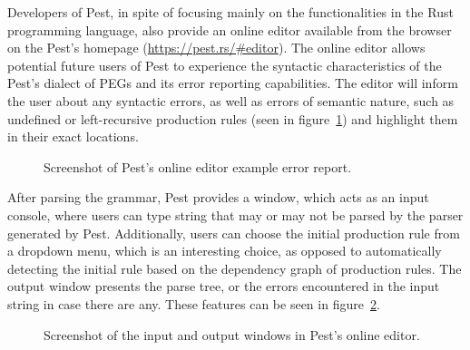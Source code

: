 \documentclass[english,engineering]{wizthesis}
\begin{document}
Developers of Pest, in spite of focusing mainly on the functionalities in the
Rust programming language, also provide an online editor available from the
browser on the Pest's homepage (\url{https://pest.rs/#editor}). The online
editor allows potential future users of Pest to experience the syntactic
characteristics of the Pest's dialect of PEGs and its error reporting
capabilities. The editor will inform the user about any syntactic errors, as
well as errors of semantic nature, such as undefined or left-recursive
production rules (seen in figure~\ref{fig:pest-error}) and highlight them in
their exact locations.

\begin{figure}[ht]
  \centering
  \caption{Screenshot of Pest's online editor example error report.}
  \label{fig:pest-error}
\end{figure}

After parsing the grammar, Pest provides a window, which acts as an input
console, where users can type string that may or may not be parsed by the parser
generated by Pest. Additionally, users can choose the initial production rule
from a dropdown menu, which is an interesting choice, as opposed to
automatically detecting the initial rule based on the dependency graph of
production rules. The output window presents the parse tree, or the errors
encountered in the input string in case there are any. These features can be
seen in figure~\ref{fig:pest-output}.

\begin{figure}[ht]
  \centering
  \caption{Screenshot of the input and output windows in Pest's online editor.}
  \label{fig:pest-output}
\end{figure}
\end{document}
